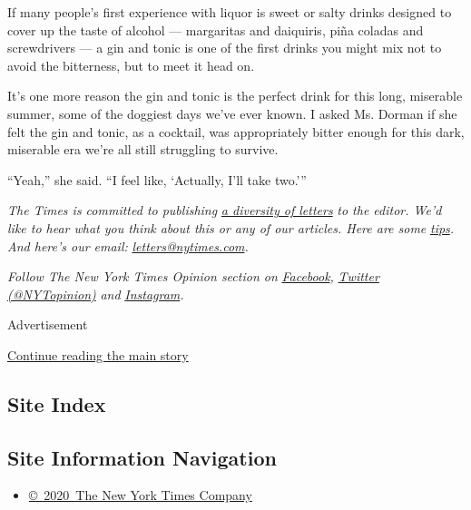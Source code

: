 If many people's first experience with liquor is sweet or salty drinks
designed to cover up the taste of alcohol --- margaritas and daiquiris,
piña coladas and screwdrivers --- a gin and tonic is one of the first
drinks you might mix not to avoid the bitterness, but to meet it head
on.

It's one more reason the gin and tonic is the perfect drink for this
long, miserable summer, some of the doggiest days we've ever known. I
asked Ms. Dorman if she felt the gin and tonic, as a cocktail, was
appropriately bitter enough for this dark, miserable era we're all still
struggling to survive.

``Yeah,'' she said. ``I feel like, `Actually, I'll take two.'''

\emph{The Times is committed to publishing}
\href{https://www.nytimes.com/2019/01/31/opinion/letters/letters-to-editor-new-york-times-women.html}{\emph{a
diversity of letters}} \emph{to the editor. We'd like to hear what you
think about this or any of our articles. Here are some}
\href{https://help.nytimes.com/hc/en-us/articles/115014925288-How-to-submit-a-letter-to-the-editor}{\emph{tips}}\emph{.
And here's our email:}
\href{mailto:letters@nytimes.com}{\emph{letters@nytimes.com}}\emph{.}

\emph{Follow The New York Times Opinion section on}
\href{https://www.facebook.com/nytopinion}{\emph{Facebook}}\emph{,}
\href{http://twitter.com/NYTOpinion}{\emph{Twitter (@NYTopinion)}}
\emph{and}
\href{https://www.instagram.com/nytopinion/}{\emph{Instagram}}\emph{.}

Advertisement

\protect\hyperlink{after-bottom}{Continue reading the main story}

\hypertarget{site-index}{%
\subsection{Site Index}\label{site-index}}

\hypertarget{site-information-navigation}{%
\subsection{Site Information
Navigation}\label{site-information-navigation}}

\begin{itemize}
\tightlist
\item
  \href{https://help.nytimes.com/hc/en-us/articles/115014792127-Copyright-notice}{©~2020~The
  New York Times Company}
\end{itemize}

